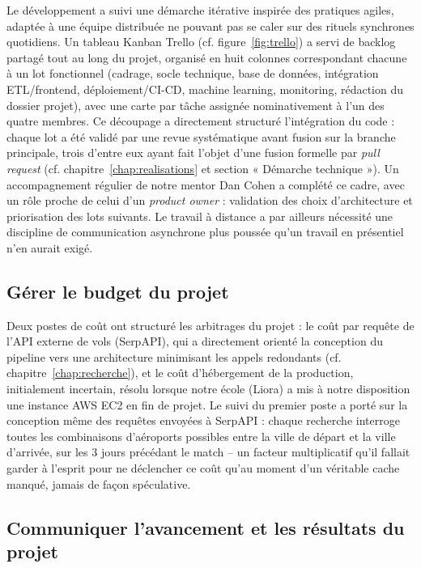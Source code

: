 \documentclass[11pt,a4paper]{report}
\begin{document}
Le développement a suivi une démarche itérative inspirée des pratiques agiles, adaptée à une équipe distribuée ne pouvant pas se caler sur des rituels synchrones quotidiens. Un tableau Kanban Trello (cf. figure~\ref{fig:trello}) a servi de backlog partagé tout au long du projet, organisé en huit colonnes correspondant chacune à un lot fonctionnel (cadrage, socle technique, base de données, intégration ETL/frontend, déploiement/CI-CD, machine learning, monitoring, rédaction du dossier projet), avec une carte par tâche assignée nominativement à l'un des quatre membres. Ce découpage a directement structuré l'intégration du code : chaque lot a été validé par une revue systématique avant fusion sur la branche principale, trois d'entre eux ayant fait l'objet d'une fusion formelle par \emph{pull request} (cf. chapitre~\ref{chap:realisations} et section « Démarche technique »). Un accompagnement régulier de notre mentor Dan Cohen a complété ce cadre, avec un rôle proche de celui d'un \emph{product owner} : validation des choix d'architecture et priorisation des lots suivants. Le travail à distance a par ailleurs nécessité une discipline de communication asynchrone plus poussée qu'un travail en présentiel n'en aurait exigé.

\subsection{Gérer le budget du projet}

Deux postes de coût ont structuré les arbitrages du projet : le coût par requête de l'API externe de vols (SerpAPI), qui a directement orienté la conception du pipeline vers une architecture minimisant les appels redondants (cf. chapitre~\ref{chap:recherche}), et le coût d'hébergement de la production, initialement incertain, résolu lorsque notre école (Liora) a mis à notre disposition une instance AWS EC2 en fin de projet. Le suivi du premier poste a porté sur la conception même des requêtes envoyées à SerpAPI : chaque recherche interroge toutes les combinaisons d'aéroports possibles entre la ville de départ et la ville d'arrivée, sur les 3 jours précédant le match -- un facteur multiplicatif qu'il fallait garder à l'esprit pour ne déclencher ce coût qu'au moment d'un véritable cache manqué, jamais de façon spéculative.

\subsection{Communiquer l'avancement et les résultats du projet}
\end{document}

